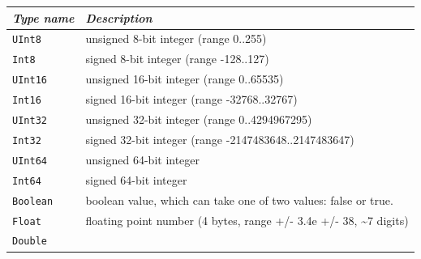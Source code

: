 \documentclass[a4paper,10pt]{scrreprt}
\newlength{\XdocTEffectiveWidth}
\begin{document}
\begin{table}
\setlength{\XdocTEffectiveWidth}{\textwidth}
\addtolength{\XdocTEffectiveWidth}{-4.0\tabcolsep}
\noindent\begin{tabular}{p{0.13\XdocTEffectiveWidth}p{0.88\XdocTEffectiveWidth}}
\toprule
\textit{Type name}

 & \textit{Description}

\\
\midrule
\protect\lstinline[language=Franca]�UInt8�

 & unsigned 8-bit integer (range 0..255)

\\
\protect\lstinline[language=Franca]�Int8�

 & signed 8-bit integer (range -128..127)

\\
\protect\lstinline[language=Franca]�UInt16�

 & unsigned 16-bit integer (range 0..65535)

\\
\protect\lstinline[language=Franca]�Int16�

 & signed 16-bit integer (range -32768..32767)

\\
\protect\lstinline[language=Franca]�UInt32�

 & unsigned 32-bit integer (range 0..4294967295)

\\
\protect\lstinline[language=Franca]�Int32�

 & signed 32-bit integer (range -2147483648..2147483647)

\\
\protect\lstinline[language=Franca]�UInt64�

 & unsigned 64-bit integer

\\
\protect\lstinline[language=Franca]�Int64�

 & signed 64-bit integer

\\
\protect\lstinline[language=Franca]�Boolean�

 & boolean value, which can take one of two values: false or true.

\\
\protect\lstinline[language=Franca]�Float�

 & floating point number (4 bytes, range +/- 3.4e +/- 38, \textasciitilde{}7 digits)

\\
\protect\lstinline[language=Franca]�Double�


\end{tabular}
\end{table}
\end{document}
